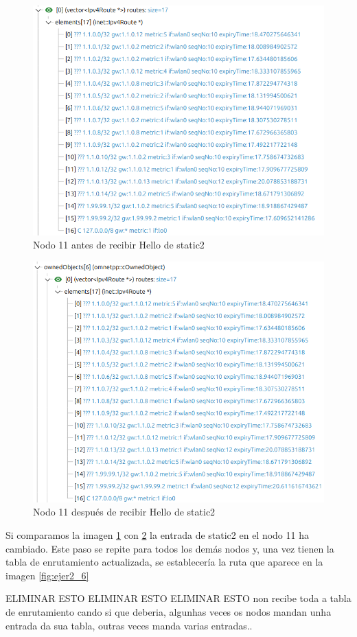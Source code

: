 \begin{figure}[H]
    \centering
    \includegraphics[width=115mm, scale=0.75]{imaxes/dsdv/ejercicio2_6_2.png}
    \caption{Nodo 11 antes de recibir Hello de static2}
    \label{fig:ejer2_6_2}
\end{figure}

\begin{figure}[H]
    \centering
    \includegraphics[width=115mm, scale=0.75]{imaxes/dsdv/ejercicio2_6_3.png}
    \caption{Nodo 11 después de recibir Hello de static2}
    \label{fig:ejer2_6_3}
\end{figure}

Si comparamos la imagen \ref{fig:ejer2_6_2} con \ref{fig:ejer2_6_3} la entrada de static2 en el nodo 11 ha cambiado. Este paso se repite para todos los demás nodos y, una vez tienen la tabla de enrutamiento actualizada, se establecería la ruta que aparece en la imagen \ref{fig:ejer2_6}


ELIMINAR ESTO
ELIMINAR ESTO
ELIMINAR ESTO
non recibe toda a tabla de enrutamiento cando si que deberia, algunhas veces os nodos mandan unha entrada da sua tabla, outras veces manda varias entradas..
